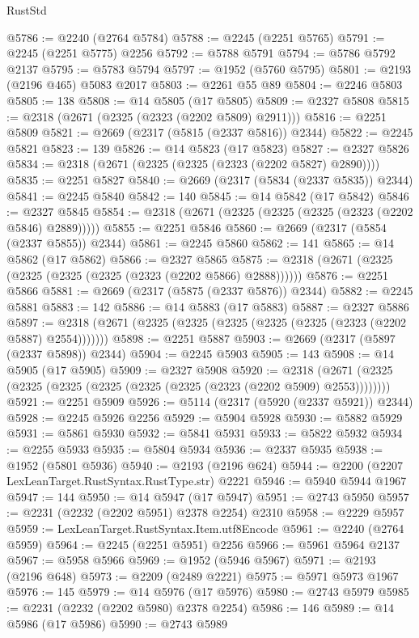 \begin{lexlean}{RustStd}
\begin{coremodule}
@5786 := @2240 (@2764 @5784)
@5788 := @2245 (@2251 @5765)
@5791 := @2245 (@2251 @5775) @2256
@5792 := @5788 @5791
@5794 := @5786 @5792 @2137
@5795 := @5783 @5794
@5797 := @1952 (@5760 @5795)
@5801 := @2193 (@2196 @465) @5083 @2017
@5803 := @2261 @55 @89
@5804 := @2246 @5803
@5805 := 138
@5808 := @14 @5805 (@17 @5805)
@5809 := @2327 @5808
@5815 := @2318 (@2671 (@2325 (@2323 (@2202 @5809) @2911)))
@5816 := @2251 @5809
@5821 := @2669 (@2317 (@5815 (@2337 @5816)) @2344)
@5822 := @2245 @5821
@5823 := 139
@5826 := @14 @5823 (@17 @5823)
@5827 := @2327 @5826
@5834 := @2318 (@2671 (@2325 (@2325 (@2323 (@2202 @5827) @2890))))
@5835 := @2251 @5827
@5840 := @2669 (@2317 (@5834 (@2337 @5835)) @2344)
@5841 := @2245 @5840
@5842 := 140
@5845 := @14 @5842 (@17 @5842)
@5846 := @2327 @5845
@5854 := @2318 (@2671 (@2325 (@2325 (@2325 (@2323 (@2202 @5846) @2889)))))
@5855 := @2251 @5846
@5860 := @2669 (@2317 (@5854 (@2337 @5855)) @2344)
@5861 := @2245 @5860
@5862 := 141
@5865 := @14 @5862 (@17 @5862)
@5866 := @2327 @5865
@5875 := @2318 (@2671 (@2325 (@2325 (@2325 (@2325 (@2323 (@2202 @5866) @2888))))))
@5876 := @2251 @5866
@5881 := @2669 (@2317 (@5875 (@2337 @5876)) @2344)
@5882 := @2245 @5881
@5883 := 142
@5886 := @14 @5883 (@17 @5883)
@5887 := @2327 @5886
@5897 := @2318 (@2671 (@2325 (@2325 (@2325 (@2325 (@2325 (@2323 (@2202 @5887) @2554)))))))
@5898 := @2251 @5887
@5903 := @2669 (@2317 (@5897 (@2337 @5898)) @2344)
@5904 := @2245 @5903
@5905 := 143
@5908 := @14 @5905 (@17 @5905)
@5909 := @2327 @5908
@5920 := @2318 (@2671 (@2325 (@2325 (@2325 (@2325 (@2325 (@2325 (@2323 (@2202 @5909) @2553))))))))
@5921 := @2251 @5909
@5926 := @5114 (@2317 (@5920 (@2337 @5921)) @2344)
@5928 := @2245 @5926 @2256
@5929 := @5904 @5928
@5930 := @5882 @5929
@5931 := @5861 @5930
@5932 := @5841 @5931
@5933 := @5822 @5932
@5934 := @2255 @5933
@5935 := @5804 @5934
@5936 := @2337 @5935
@5938 := @1952 (@5801 @5936)
@5940 := @2193 (@2196 @624)
@5944 := @2200 (@2207 LexLeanTarget.RustSyntax.RustType.str) @2221
@5946 := @5940 @5944 @1967
@5947 := 144
@5950 := @14 @5947 (@17 @5947)
@5951 := @2743 @5950
@5957 := @2231 (@2232 (@2202 @5951) @2378 @2254) @2310
@5958 := @2229 @5957
@5959 := LexLeanTarget.RustSyntax.Item.utf8Encode
@5961 := @2240 (@2764 @5959)
@5964 := @2245 (@2251 @5951) @2256
@5966 := @5961 @5964 @2137
@5967 := @5958 @5966
@5969 := @1952 (@5946 @5967)
@5971 := @2193 (@2196 @648)
@5973 := @2209 (@2489 @2221)
@5975 := @5971 @5973 @1967
@5976 := 145
@5979 := @14 @5976 (@17 @5976)
@5980 := @2743 @5979
@5985 := @2231 (@2232 (@2202 @5980) @2378 @2254)
@5986 := 146
@5989 := @14 @5986 (@17 @5986)
@5990 := @2743 @5989

\end{coremodule}
\end{lexlean}
